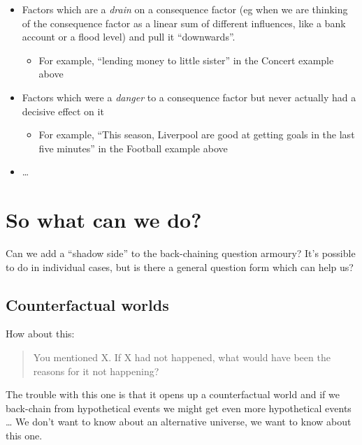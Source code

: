 \documentclass[
]{book}
\providecommand{\tightlist}{%
  \setlength{\itemsep}{0pt}\setlength{\parskip}{0pt}}
\begin{document}
\begin{itemize}
\tightlist
\item
  Factors which are a \emph{drain} on a consequence factor (eg when we are thinking of the consequence factor as a linear sum of different influences, like a bank account or a flood level) and pull it ``downwards''.

  \begin{itemize}
  \tightlist
  \item
    For example, ``lending money to little sister'' in the Concert example above
  \end{itemize}
\item
  Factors which were a \emph{danger} to a consequence factor but never actually had a decisive effect on it

  \begin{itemize}
  \tightlist
  \item
    For example, ``This season, Liverpool are good at getting goals in the last five minutes'' in the Football example above
  \end{itemize}
\item
  \ldots{}
\end{itemize}

\hypertarget{so-what-can-we-do}{%
\section{So what can we do?}\label{so-what-can-we-do}}

Can we add a ``shadow side'' to the back-chaining question armoury? It's possible to do in individual cases, but is there a general question form which can help us?

\hypertarget{counterfactual-worlds}{%
\subsection{Counterfactual worlds}\label{counterfactual-worlds}}

How about this:

\begin{quote}
You mentioned X. If X had not happened, what would have been the reasons for it not happening?
\end{quote}

The trouble with this one is that it opens up a counterfactual world and if we back-chain from hypothetical events we might get even more hypothetical events \ldots{} We don't want to know about an alternative universe, we want to know about this one.
\end{document}
